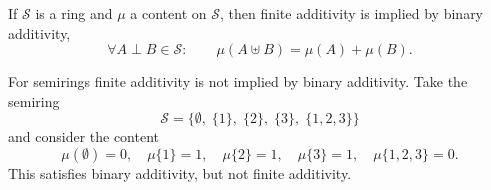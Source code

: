 \begin{lemma} \label{ringContentAdditivityFromBinaryAdditivity}
If $\mathcal{S}$ is a ring and $\mu$ a content on $\mathcal{S}$, then finite additivity is implied by binary additivity,
\[ \forall A\perp B\in \mathcal{S}:\qquad \mu(A\uplus B) = \mu(A) + \mu(B). \]
\end{lemma}

\begin{example}
For semirings finite additivity is not implied by binary additivity. Take the semiring
\[ \mathcal{S} = \big\{\emptyset,\; \{1\},\; \{2\},\; \{3\},\; \{1,2,3\}\big\} \]
and consider the content
\[ \mu(\emptyset) = 0,\quad \mu\{1\} = 1, \quad \mu\{2\} = 1, \quad \mu\{3\} = 1, \quad \mu\{1,2,3\} = 0. \]
This satisfies binary additivity, but not finite additivity.
\end{example}

